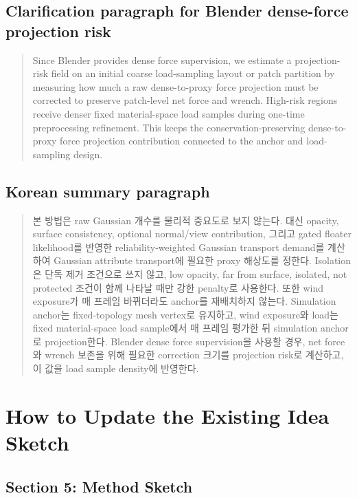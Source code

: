 \documentclass[11pt,a4paper]{article}
\begin{document}
\subsection{Clarification paragraph for Blender dense-force projection risk}

\begin{quote}
Since Blender provides dense force supervision, we estimate a projection-risk field on an initial coarse load-sampling layout or patch partition by measuring how much a raw dense-to-proxy force projection must be corrected to preserve patch-level net force and wrench. High-risk regions receive denser fixed material-space load samples during one-time preprocessing refinement. This keeps the conservation-preserving dense-to-proxy force projection contribution connected to the anchor and load-sampling design.
\end{quote}

\subsection{Korean summary paragraph}

\begin{quote}
본 방법은 raw Gaussian 개수를 물리적 중요도로 보지 않는다. 대신 opacity, surface consistency, optional normal/view contribution, 그리고 gated floater likelihood를 반영한 reliability-weighted Gaussian transport demand를 계산하여 Gaussian attribute transport에 필요한 proxy 해상도를 정한다. Isolation은 단독 제거 조건으로 쓰지 않고, low opacity, far from surface, isolated, not protected 조건이 함께 나타날 때만 강한 penalty로 사용한다. 또한 wind exposure가 매 프레임 바뀌더라도 anchor를 재배치하지 않는다. Simulation anchor는 fixed-topology mesh vertex로 유지하고, wind exposure와 load는 fixed material-space load sample에서 매 프레임 평가한 뒤 simulation anchor로 projection한다. Blender dense force supervision을 사용할 경우, net force와 wrench 보존을 위해 필요한 correction 크기를 projection risk로 계산하고, 이 값을 load sample density에 반영한다.
\end{quote}

\section{How to Update the Existing Idea Sketch}

\subsection{Section 5: Method Sketch}
\end{document}
